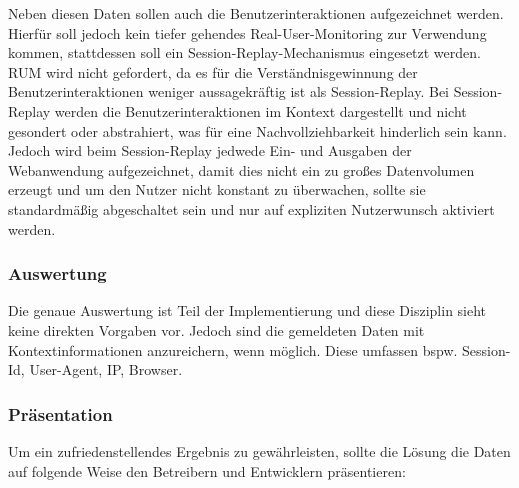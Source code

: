 	Neben diesen Daten sollen auch die Benutzerinteraktionen aufgezeichnet werden. Hierfür soll jedoch kein tiefer gehendes Real-User-Monitoring zur Verwendung kommen, stattdessen soll ein Session-Replay-Mechanismus eingesetzt werden. RUM wird nicht gefordert, da es für die Verständnisgewinnung der Benutzerinteraktionen weniger aussagekräftig ist als Session-Replay. Bei Session-Replay werden die Benutzerinteraktionen im Kontext dargestellt und nicht gesondert oder abstrahiert, was für eine Nachvollziehbarkeit hinderlich sein kann. Jedoch wird beim Session-Replay jedwede Ein- und Ausgaben der Webanwendung aufgezeichnet, damit dies nicht ein zu großes Datenvolumen erzeugt und um den Nutzer nicht konstant zu überwachen, sollte sie standardmäßig abgeschaltet sein und nur auf expliziten Nutzerwunsch aktiviert werden.
	
	\vspace{-0.75\baselineskip}
	\subsubsection{Auswertung}
	\vspace{-0.50\baselineskip}
	
	Die genaue Auswertung ist Teil der Implementierung und diese Disziplin sieht keine direkten Vorgaben vor. Jedoch sind die gemeldeten Daten mit Kontextinformationen anzureichern, wenn möglich. Diese umfassen bspw. Session-Id, User-Agent, IP, Browser.
	
	\vspace{-0.75\baselineskip}
	\subsubsection{Präsentation}
	\vspace{-0.50\baselineskip}
	
	Um ein zufriedenstellendes Ergebnis zu gewährleisten, sollte die Lösung die Daten auf folgende Weise den Betreibern und Entwicklern präsentieren:
	
